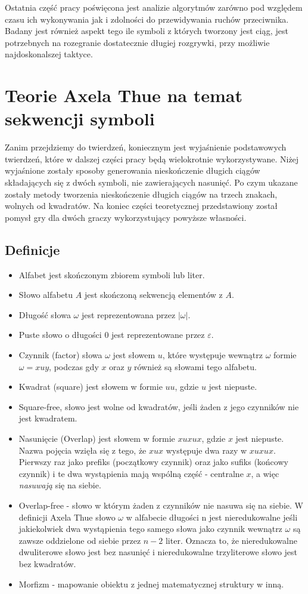 \documentclass[document]{xmgr}
\begin{document}
Ostatnia część pracy poświęcona jest analizie algorytmów zarówno pod względem czasu ich wykonywania jak i zdolności do przewidywania ruchów przeciwnika. Badany jest również aspekt tego ile symboli z których tworzony jest ciąg, jest potrzebnych na rozegranie dostatecznie długiej rozgrywki, przy możliwie najdoskonalszej taktyce.

\chapter{Teorie Axela Thue na temat sekwencji symboli}
Zanim przejdziemy do twierdzeń, koniecznym jest wyjaśnienie podstawowych twierdzeń, które w dalszej części pracy będą wielokrotnie wykorzystywane. Niżej wyjaśnione zostały sposoby generowania nieskończenie długich ciągów składających się z dwóch symboli, nie zawierających nasunięć. Po czym ukazane zostały metody tworzenia nieskończenie długich ciągów na trzech znakach, wolnych od kwadratów. Na koniec części teoretycznej przedstawiony został pomysł gry dla dwóch graczy wykorzystujący powyższe własności.


\section{Definicje}


\begin{itemize}
\item Alfabet jest skończonym zbiorem symboli lub liter.
\item Słowo alfabetu $A$ jest skończoną sekwencją elementów z $A$. 
\item Długość słowa $\omega$ jest reprezentowana przez $|\omega|$.
\item Puste słowo o długości $0$ jest reprezentowane przez $\varepsilon$.
\item Czynnik (factor) słowa $\omega$ jest słowem $u$, które występuje wewnątrz $\omega$ formie $\omega = xuy$, podczas gdy $x$ oraz $y$ również są słowami tego alfabetu.
\item Kwadrat (square) jest słowem w formie $uu$, gdzie $u$ jest niepuste.
\item Square-free, słowo jest wolne od kwadratów, jeśli żaden z jego czynników nie jest kwadratem.
\item Nasunięcie (Overlap) jest słowem w formie $xuxux$, gdzie $x$ jest niepuste. Nazwa pojęcia wzięła się z tego, że $xux$ występuje dwa razy w $xuxux$. Pierwszy raz jako prefiks (początkowy czynnik) oraz jako sufiks (końcowy czynnik) i te dwa wystąpienia mają wspólną część - centralne $x$, a więc \textit{nasuwają} się na siebie.
\item Overlap-free - słowo w którym żaden z czynników nie nasuwa się na siebie.
W definicji Axela Thue słowo $\omega$ w alfabecie długości n jest nieredukowalne jeśli jakiekolwiek dwa wystąpienia tego samego słowa jako czynnik wewnątrz $\omega$ są zawsze oddzielone od siebie przez $n-2$ liter. Oznacza to, że nieredukowalne dwuliterowe słowo jest bez nasunięć i nieredukowalne trzyliterowe słowo jest bez kwadratów.
\item Morfizm - mapowanie obiektu z jednej matematycznej struktury w inną.
\end{itemize}
\end{document}

